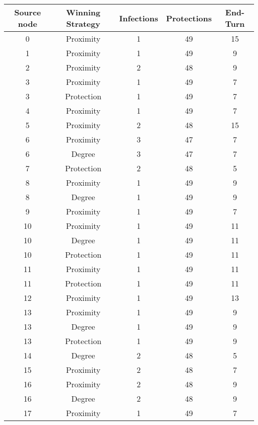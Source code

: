 \documentclass[results.tex]{subfiles}
\begin{document}
\begin{center}
  \begin{tabular}{| c || c | c | c | c |}
    \hline
    {\bfseries Source node} & {\bfseries Winning Strategy} & {\bfseries Infections} & {\bfseries Protections} & {\bfseries End-Turn} \\  %
    \hline\hline
    0 & Proximity & 1 & 49 & 15 \\ 
    \hline
    1 & Proximity & 1 & 49 & 9 \\ 
    \hline
    2 & Proximity & 2 & 48 & 9 \\ 
    \hline
    3 & Proximity & 1 & 49 & 7 \\ 
    \hline
    3 & Protection & 1 & 49 & 7 \\ 
    \hline
    4 & Proximity & 1 & 49 & 7 \\ 
    \hline
    5 & Proximity & 2 & 48 & 15 \\ 
    \hline
    6 & Proximity & 3 & 47 & 7 \\ 
    \hline
    6 & Degree & 3 & 47 & 7 \\ 
    \hline
    7 & Protection & 2 & 48 & 5 \\ 
    \hline
    8 & Proximity & 1 & 49 & 9 \\ 
    \hline
    8 & Degree & 1 & 49 & 9 \\ 
    \hline
    9 & Proximity & 1 & 49 & 7 \\ 
    \hline
    10 & Proximity & 1 & 49 & 11 \\ 
    \hline
    10 & Degree & 1 & 49 & 11 \\ 
    \hline
    10 & Protection & 1 & 49 & 11 \\ 
    \hline
    11 & Proximity & 1 & 49 & 11 \\ 
    \hline
    11 & Protection & 1 & 49 & 11 \\ 
    \hline
    12 & Proximity & 1 & 49 & 13 \\ 
    \hline
    13 & Proximity & 1 & 49 & 9 \\ 
    \hline
    13 & Degree & 1 & 49 & 9 \\ 
    \hline
    13 & Protection & 1 & 49 & 9 \\ 
    \hline
    14 & Degree & 2 & 48 & 5 \\ 
    \hline
    15 & Proximity & 2 & 48 & 7 \\ 
    \hline
    16 & Proximity & 2 & 48 & 9 \\ 
    \hline
    16 & Degree & 2 & 48 & 9 \\ 
    \hline
    17 & Proximity & 1 & 49 & 7 \\ 

\end{tabular}
\end{center}
\end{document}
